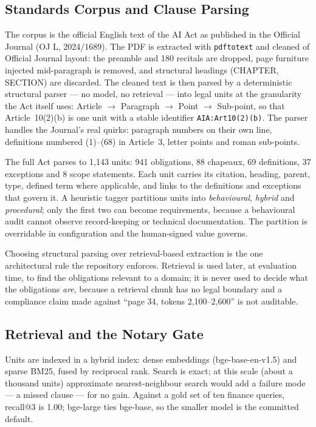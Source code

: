 \documentclass[11pt,a4paper]{article}
\begin{document}
\subsection{Standards Corpus and Clause Parsing}

The corpus is the official English text of the AI Act as published in the
Official Journal (OJ L, 2024/1689). The PDF is extracted with
\texttt{pdftotext} and cleaned of Official Journal layout: the preamble and
180 recitals are dropped, page furniture injected mid-paragraph is removed,
and structural headings (CHAPTER, SECTION) are discarded. The cleaned text is
then parsed by a deterministic structural parser --- no model, no retrieval
--- into legal units at the granularity the Act itself uses: Article $\to$
Paragraph $\to$ Point $\to$ Sub-point, so that Article~10(2)(b) is one unit
with a stable identifier \texttt{AIA:Art10(2)(b)}. The parser handles the
Journal's real quirks: paragraph numbers on their own line, definitions
numbered (1)--(68) in Article~3, letter points and roman sub-points.

The full Act parses to 1,143 units: 941 obligations, 88 chapeaux, 69
definitions, 37 exceptions and 8 scope statements. Each unit carries its
citation, heading, parent, type, defined term where applicable, and links to
the definitions and exceptions that govern it. A heuristic tagger partitions
units into \emph{behavioural}, \emph{hybrid} and \emph{procedural}; only the
first two can become requirements, because a behavioural audit cannot observe
record-keeping or technical documentation. The partition is overridable in
configuration and the human-signed value governs.

Choosing structural parsing over retrieval-based extraction is the one
architectural rule the repository enforces. Retrieval is used later, at
evaluation time, to find the obligations relevant to a domain; it is never
used to decide what the obligations \emph{are}, because a retrieval chunk has
no legal boundary and a compliance claim made against ``page 34, tokens
2,100--2,600'' is not auditable.

\subsection{Retrieval and the Notary Gate}

Units are indexed in a hybrid index: dense embeddings (bge-base-en-v1.5) and
sparse BM25, fused by reciprocal rank. Search is exact; at this scale (about
a thousand units) approximate nearest-neighbour search would add a failure
mode --- a missed clause --- for no gain. Against a gold set of ten finance
queries, recall@3 is 1.00; bge-large ties bge-base, so the smaller model is
the committed default.
\end{document}
